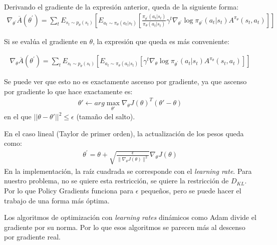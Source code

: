Derivando el gradiente de la expresión anterior, queda de la siguiente forma:
\begin{align}
\nabla _ { \theta ^ { \prime } } \overline { A } ( \theta ^ { \prime } ) = \sum _ { t } E _ { s _ { t } \sim p _ { \theta } ( s _ { t } ) } \left[ E _ { a _ { t } \sim \pi _ { \theta } ( a _ { t } | s _ { t } ) } \left[ \frac { \pi _ { \theta ^ { \prime } } ( a _ { t } | s _ { t } ) } { \pi _ { \theta } ( a _ { t } | s _ { t } ) } \gamma ^ { t } \nabla _ { \theta ^ { \prime } } \operatorname { log } \pi _ { \theta ^ { \prime } } ( a _ { t } | s _ { t } ) A ^ { \pi _ { \theta } } ( s _ { t } , a _ { t } ) \right] \right]
\end{align}

Si se evalúa el gradiente en $\theta$, la expresión que queda es más conveniente:

\begin{align}
\nabla _ { \theta } \overline { A } ( \theta ^ { \prime } ) = \sum _ { t } E _ { s _ { t } \sim p _ { \theta } ( s _ { t } ) } \left[ E _ { a _ { t } \sim \pi _ { \theta } ( a _ { t } | s _ { t } ) } \left[ \gamma ^ { t } \nabla _ { \theta} \operatorname { log } \pi _ { \theta ^ { \prime } } ( a _ { t } | s _ { t } ) A ^ { \pi _ { \theta } } ( s _ { t } , a _ { t } ) \right] \right]
\end{align}

Se puede ver que esto no es exactamente ascenso por gradiente, ya que ascenso por
gradiente lo que hace exactamente es:
\begin{align}
    \theta'\gets arg\max_{\theta'}\nabla_\theta J(\theta)^T(\theta'-\theta)
\end{align}
en el que $||\theta-\theta'||^2\leq \epsilon$ (tamaño del salto).

En el caso lineal (Taylor de primer orden), la actualización de los pesos queda como:
\begin{align}
\theta ^ { \prime } = \theta + \sqrt { \frac { \epsilon } { \| \nabla _ { \theta } J ( \theta ) \| ^ { 2 } } } \nabla _ { \theta } J ( \theta )
\end{align}
En la implementación, la raíz cuadrada se corresponde con el \textit{learning
rate}. Para nuestro problema, no se quiere esta restricción, se quiere la restricción de
$D_{KL}$. Por lo que Policy Gradients funciona para $\epsilon$ pequeños, pero se puede hacer
el trabajo de una forma más óptima.

Los algoritmos de optimización con \textit{learning rates} dinámicos como Adam divide el
gradiente por su norma. Por lo que esos algoritmos se parecen más al descenso por
gradiente real.


